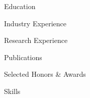 \documentclass[11pt]{resume}
\begin{document}
\begin{rSection}{Education}
\end{rSection}

\begin{rSection}{Industry Experience}
\end{rSection}

\begin{rSection}{Research Experience}
\end{rSection}

\begin{rSection}{Publications}
\end{rSection}

\begin{rSection}{Selected Honors \& Awards}
\end{rSection}

\begin{rSection}{Skills}
\end{rSection}
\end{document}
